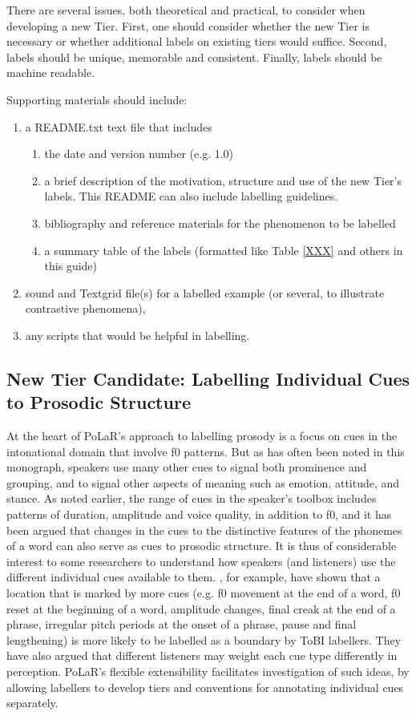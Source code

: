\documentclass[11pt, twoside]{memoir}
\begin{document}
There are several issues, both theoretical and practical, to consider when developing a new Tier. First, one should consider whether the new Tier is necessary or whether additional labels on existing tiers would suffice. Second, labels should be unique,  memorable and consistent. Finally, labels should be machine readable. 

Supporting materials should include:
\begin{enumerate}
	\item a README.txt text  file that includes
	\begin{enumerate}
		\item the date and version number (e.g. 1.0) 
		\item a brief description of the motivation, structure  and use of the new Tier’s labels. This README can also include labelling guidelines.
		\item bibliography and reference materials for the phenomenon to be labelled
		\item a summary table of the labels (formatted like Table \ref{XXX} and others in this guide)
	\end{enumerate}
	\item sound and Textgrid file(s) for a labelled example (or several, to illustrate contrastive phenomena),
	\item any scripts that would be helpful in labelling. 
\end{enumerate}

\subsection{New Tier Candidate: Labelling Individual Cues to Prosodic Structure}\label{sec:labelling-individual-cues}
At the heart of PoLaR’s approach to labelling prosody is a focus on cues in the intonational domain that involve f0 patterns.  But as has often been noted in this monograph, speakers use many other cues to signal both prominence and grouping, and to signal other aspects of meaning such as emotion, attitude, and stance. As noted earlier, the range of cues in the speaker’s toolbox includes patterns of duration, amplitude and voice quality, in addition to f0, and it has been argued that changes in the cues to the distinctive features of the phonemes of a word can also serve as cues to prosodic structure. It is thus of considerable interest to some researchers to understand how speakers (and listeners) use the different individual cues available to them.  \citet{brugos-18}, for example, have shown that a location that is marked by more cues (e.g. f0 movement at the end of a word, f0 reset at the beginning of a word, amplitude changes, final creak at the end of a phrase, irregular pitch periods at the onset of a phrase, pause and final lengthening) is more likely to be labelled as a boundary by ToBI labellers.  They have also argued that different listeners may weight each cue type differently in perception. PoLaR’s flexible extensibility facilitates investigation of such ideas, by allowing labellers to develop tiers and conventions for annotating individual cues separately. 
\end{document}
